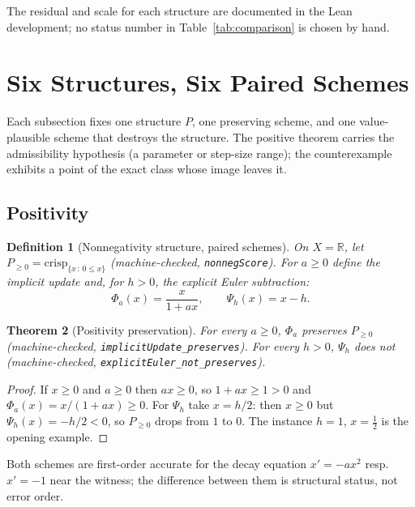 \documentclass[11pt,a4paper]{article}
\newtheorem{theorem}{Theorem}[section]
\newtheorem{definition}[theorem]{Definition}
\newcommand{\Real}{\mathbb{R}}
\begin{document}
The residual and scale for each structure are documented in the Lean
development; no status number in Table~\ref{tab:comparison} is chosen
by hand.

\section{Six Structures, Six Paired Schemes}
\label{sec:numerics}

Each subsection fixes one structure $P$, one preserving scheme, and one
value-plausible scheme that destroys the structure.
The positive theorem carries the admissibility hypothesis (a parameter
or step-size range); the counterexample exhibits a point of the exact
class whose image leaves it.

\subsection{Positivity}

\begin{definition}[Nonnegativity structure, paired schemes]
\label{def:positivity}
On $X = \Real$, let $P_{\ge 0} = \mathrm{crisp}_{\{x \,:\, 0 \le x\}}$
(machine-checked, \texttt{nonnegScore}).
For $a \ge 0$ define the implicit update and, for $h > 0$, the explicit
Euler subtraction:
\[
  \Phi_a(x) = \frac{x}{1 + a x},
  \qquad
  \Psi_h(x) = x - h .
\]
\end{definition}

\begin{theorem}[Positivity preservation]
\label{thm:positivity}
For every $a \ge 0$, $\Phi_a$ preserves $P_{\ge 0}$
(machine-checked, \texttt{implicitUpdate\_preserves}).
For every $h > 0$, $\Psi_h$ does not
(machine-checked, \texttt{explicitEuler\_not\_preserves}).
\end{theorem}
\begin{proof}
If $x \ge 0$ and $a \ge 0$ then $a x \ge 0$, so $1 + a x \ge 1 > 0$ and
$\Phi_a(x) = x/(1 + a x) \ge 0$.
For $\Psi_h$ take $x = h/2$: then $x \ge 0$ but
$\Psi_h(x) = -h/2 < 0$, so $P_{\ge 0}$ drops from $1$ to $0$.
The instance $h = 1$, $x = \tfrac{1}{2}$ is the opening example.
\end{proof}

Both schemes are first-order accurate for the decay equation
$x' = -a x^2$ resp.\ $x' = -1$ near the witness; the difference between
them is structural status, not error order.
\end{document}
